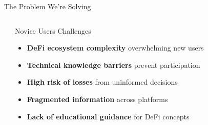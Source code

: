 \documentclass[aspectratio=169]{beamer}
\begin{document}
\begin{frame}{The Problem We're Solving}
\vspace{0.05cm}
\begin{columns}[c]
\begin{center}
\end{center}

\vspace{0.05cm}

\begin{block}{Novice Users Challenges}
\vspace{0.05cm}
\begin{itemize}
\setlength\itemsep{-0.1em}
\setlength\leftmargin{1em}
\item[\color{accent}\faExclamationTriangle] \textbf{DeFi ecosystem complexity} overwhelming new users
\item[\color{accent}\faQuestion] \textbf{Technical knowledge barriers} prevent participation
\item[\color{accent}\faExclamation] \textbf{High risk of losses} from uninformed decisions
\item[\color{accent}\faPuzzlePiece] \textbf{Fragmented information} across platforms
\item[\color{accent}\faGraduationCap] \textbf{Lack of educational guidance} for DeFi concepts
\end{itemize}
\vspace{0.05cm}
\end{block}


\begin{center}
\end{center}

\vspace{0.05cm}


\end{columns}
\end{frame}
\end{document}
